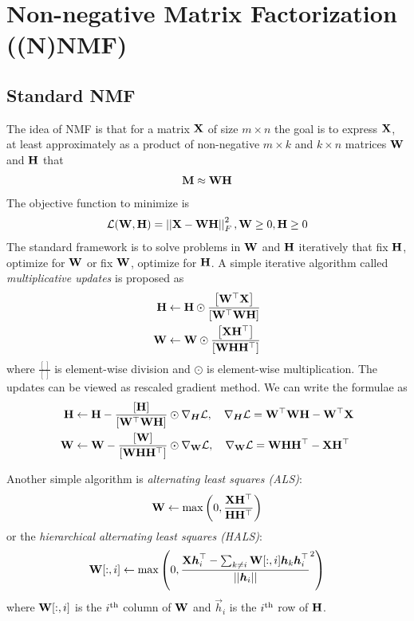 \section{Non-negative Matrix Factorization ((N)NMF)}
\label{section4.3}

\subsection{Standard NMF}

The idea of NMF is that for a matrix $\mathbf{X}$ of size $m\times n$ the goal is to express $\mathbf{X}$, at least approximately as a product of non-negative $m\times k$ and $k\times n$ matrices $\mathbf{W}$ and $\mathbf{H}$ that
\begin{align*}
	\mathbf{M}\approx\mathbf{W}\mathbf{H}
\end{align*}
The objective function to minimize is
\begin{align*}
	\mathcal{L}(\mathbf{W},\mathbf{H})=\left\vert\left\vert \mathbf{X}-\mathbf{W}\mathbf{H} \right\vert\right\vert_F^2,\mathbf{W}\geq 0,\mathbf{H}\geq 0
\end{align*}
The standard framework is to solve problems in $\mathbf{W}$ and $\mathbf{H}$ iteratively that fix $\mathbf{H}$, optimize for $\mathbf{W}$ or fix $\mathbf{W}$, optimize for $\mathbf{H}$. A simple iterative algorithm called \emph{multiplicative updates} is proposed as
\begin{align*}
	\mathbf{H}&\gets\mathbf{H}\odot\frac{\left[\mathbf{W}{}^\top\mathbf{X}\right]}{\left[\mathbf{W}{}^\top\mathbf{W}\mathbf{H}\right]} \\
	\mathbf{W}&\gets\mathbf{W}\odot\frac{\left[\mathbf{X}\mathbf{H}{}^\top\right]}{\left[\mathbf{W}\mathbf{H}\mathbf{H}{}^\top\right]}
\end{align*}
where $\frac{[]}{[]}$ is element-wise division and $\odot$ is element-wise multiplication. The updates can be viewed as rescaled gradient method. We can write the formulae as
\begin{align*}
	\mathbf{H}&\gets\mathbf{H}-\frac{\left[\mathbf{H}\right]}{\left[\mathbf{W}{}^\top\mathbf{W}\mathbf{H}\right]}\odot\nabla_{\boldsymbol{H}}\mathcal{L},\quad\nabla_{\boldsymbol{H}}\mathcal{L}=\mathbf{W}{}^\top\mathbf{W}\mathbf{H}-\mathbf{W}{}^\top\mathbf{X} \\
	\mathbf{W}&\gets\mathbf{W}-\frac{\left[\mathbf{W}\right]}{\left[\mathbf{W}\mathbf{H}\mathbf{H}{}^\top\right]}\odot\nabla_{\mathbf{W}}\mathcal{L},\quad\nabla_{\mathbf{W}}\mathcal{L}=\mathbf{W}\mathbf{H}\mathbf{H}{}^\top-\mathbf{X}\mathbf{H}{}^\top
\end{align*}

Another simple algorithm is \emph{alternating least squares (ALS)}:
\begin{align*}
	\mathbf{W}\gets\max\left(0,\frac{\mathbf{X}\mathbf{H}{}^\top}{\mathbf{H}\mathbf{H}{}^\top}\right)
\end{align*}
or the \emph{hierarchical alternating least squares (HALS)}:
\begin{align*}
	\mathbf{W}[:,i]\gets\max\left(0,\frac{\mathbf{X}\boldsymbol{h}_i^\top-\sum_{k\neq i}\mathbf{W}[:,i]\boldsymbol{h}_k\boldsymbol{h}_i^\top}{\left\vert\left\vert \boldsymbol{h}_i \right\vert\right\vert}^2\right)
\end{align*}
where $\mathbf{W}[:,i]$ is the $i^\text{th}$ column of $\mathbf{W}$ and $\vec{h}_i$ is the $i^\text{th}$ row of $\mathbf{H}$.

